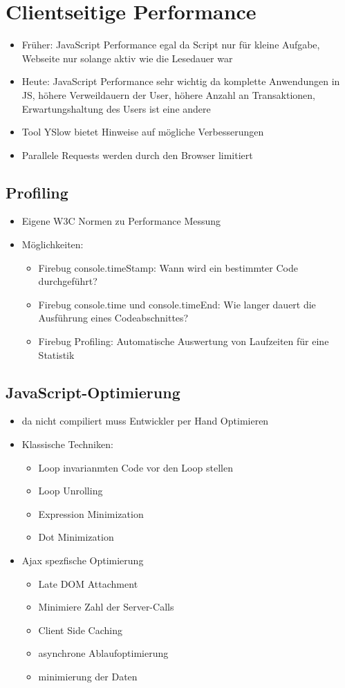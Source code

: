 \documentclass{article} %
\begin{document}
	
\section{Clientseitige Performance}
	\begin{itemize}
		\item Früher: JavaScript Performance egal da Script nur für kleine Aufgabe, Webseite nur solange aktiv wie die Lesedauer war
		\item Heute: JavaScript Performance sehr wichtig da komplette Anwendungen in JS, höhere Verweildauern der User, höhere Anzahl an Transaktionen, Erwartungshaltung des Users ist eine andere
		\item Tool YSlow bietet Hinweise auf mögliche Verbesserungen
		\item Parallele Requests werden durch den Browser limitiert
	\end{itemize}
	\subsection{Profiling}
	\begin{itemize}
		\item Eigene W3C Normen zu Performance Messung
		\item Möglichkeiten:
		\begin{itemize}
			\item Firebug console.timeStamp: Wann wird ein bestimmter Code durchgeführt?
			\item Firebug console.time und console.timeEnd: Wie langer dauert die Ausführung eines Codeabschnittes?
			\item Firebug Profiling: Automatische Auswertung von Laufzeiten für eine Statistik 
		\end{itemize}
	\end{itemize}
	\subsection{JavaScript-Optimierung}
	\begin{itemize}
		\item da nicht compiliert muss Entwickler per Hand Optimieren
		\item Klassische Techniken:
		\begin{itemize}
			\item Loop invarianmten Code vor den Loop stellen
			\item Loop Unrolling
			\item Expression Minimization
			\item Dot Minimization
		\end{itemize}
		\item Ajax spezfische Optimierung
		\begin{itemize}
			\item Late DOM Attachment
			\item Minimiere Zahl der Server-Calls
			\item Client Side Caching
			\item asynchrone Ablaufoptimierung
			\item minimierung der Daten
		\end{itemize}
	\end{itemize}
\end{document}

